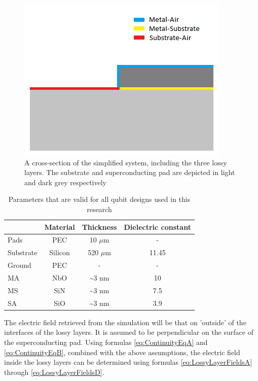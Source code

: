 \begin{figure}
	\begin{center}
		\includegraphics[scale=.8]{Figures/model}
		\caption{A cross-section of the simplified system, including the three lossy layers. The substrate and superconducting pad are depicted in light and dark grey respectively}
		\label{fig:model}
	\end{center}
\end{figure}

\begin{table}
	\begin{center}
		\begin{tabular}{ | l || c | c | c |}
			\hline
			& Material & Thickness & Dielectric constant \\ \hline
			Pads & PEC & 10 \(\mu\)m & - \\
			Substrate & Silicon & 520 \(\mu\)m & 11.45 \\
			Ground & PEC & - & - \\
			MA & NbO & \textasciitilde 3 nm & 10 \\
			MS & SiN & \textasciitilde 3 nm & 7.5 \\
			SA & SiO & \textasciitilde 3 nm & 3.9 \\
			\hline
		\end{tabular}
	\end{center}
	\caption{Parameters that are valid for all qubit designs used in this research}
	\label{table:standard_parameters}
\end{table}

The electric field retrieved from the simulation will be that on 'outside' of the interfaces of the lossy layers. It is assumed to be perpendicular on the surface of the superconducting pad. Using formulas \eqref{eq:ContinuityEqA} and \eqref{eq:ContinuityEqB}, combined with the above assumptions, the electric field inside the lossy layers can be determined using formulas \eqref{eq:LossyLayerFieldsA} through \eqref{eq:LossyLayerFieldsD}.

